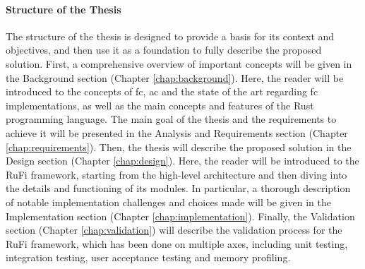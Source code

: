 \paragraph{Structure of the Thesis}
The structure of the thesis is designed to provide a basis for its context and objectives, and then use it as a foundation to fully describe the proposed solution.
First, a comprehensive overview of important concepts will be given in the Background section (Chapter \ref{chap:background}). Here, the reader will be introduced to the concepts
of \ac{fc}, \ac{ac} and the state of the art regarding \ac{fc} implementations, as well as the main concepts and features of the Rust programming language.
The main goal of the thesis and the requirements to achieve it will be presented in the Analysis and Requirements section (Chapter \ref{chap:requirements}).
Then, the thesis will describe the proposed solution in the Design section (Chapter \ref{chap:design}). Here, the reader will be introduced to the RuFi framework,
starting from the high-level architecture and then diving into the details and functioning of its modules. In particular, a thorough description of notable
implementation challenges and choices made will be given in the Implementation section (Chapter \ref{chap:implementation}). Finally, the Validation section (Chapter \ref{chap:validation})
will describe the validation process for the RuFi framework, which has been done on multiple axes, including unit testing, integration testing, user acceptance testing and memory profiling.
